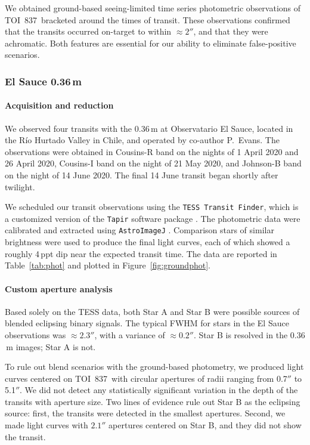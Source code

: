 \documentclass[12pt,twocolumn,tighten]{aastex63}
\newcommand{\tn}{TOI~837} %
\begin{document}
We obtained ground-based seeing-limited time series photometric
observations of \tn\ bracketed around the times of transit.  These
observations confirmed that the transits occurred on-target to within
$\approx 2''$, and that they were achromatic. Both features are
essential for our ability to eliminate false-positive scenarios.

\subsubsection{El Sauce 0.36$\,$m}

\paragraph{Acquisition and reduction}
We observed four transits with the 0.36$\,$m at Observatario El Sauce,
located in the R\'io Hurtado Valley in Chile, and operated by
co-author P{.}~Evans.  The observations were obtained in Cousins-R
band on the nights of 1 April 2020 and 26 April 2020, Cousins-I band
on the night of 21 May 2020, and Johnson-B band on the night of 14
June 2020.  The final 14 June transit began shortly after twilight.

We scheduled our transit observations using the {\tt TESS Transit
Finder}, which is a customized version of the {\tt Tapir} software
package \citep{Jensen:2013}.  The photometric data were calibrated and
extracted using \texttt{AstroImageJ} \citep{collins_astroimagej_2017}.
Comparison stars of similar brightness were used to produce the final
light curves, each of which showed a roughly 4$\,$ppt dip near the
expected transit time.  The data are reported in Table~\ref{tab:phot}
and plotted in Figure~\ref{fig:groundphot}.


\paragraph{Custom aperture analysis}
Based solely on the TESS data, both Star A and Star B were possible
sources of blended eclipsing binary signals.  The typical FWHM for
stars in the El Sauce observations was $\approx 2.3''$, with a
variance of $\approx 0.2''$.  Star B is resolved in the 0.36$\,$m images;
Star A is not.

To rule out blend scenarios with the ground-based photometry, we
produced light curves centered on \tn\ with circular apertures of
radii ranging from 0.7$''$ to 5.1$''$.  We did not detect any
statistically significant variation in the depth of the transits with
aperture size.  Two lines of evidence rule out Star B as the eclipsing
source: first, the transits were detected in the smallest apertures.
Second, we made light curves with $2.1''$ apertures centered on Star
B, and they did not show the transit.
\end{document}
